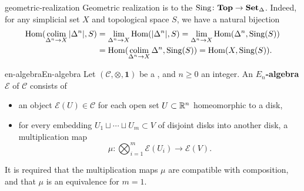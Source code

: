 \begin{example}{geometric-realization}
    Geometric realization is  to the  $\textup{Sing} \colon \textbf{Top} \to \textbf{Set}_\Delta$. Indeed, for any simplicial set $X$ and topological space $S$, we have a natural bijection
    \[ \begin{aligned}
        \operatorname{Hom}(\operatorname*{colim}_{\Delta^n \to X} |\Delta^n|, S) &= \lim_{\Delta^n \to X} \operatorname{Hom}(|\Delta^n|, S) = \lim_{\Delta^n \to X} \operatorname{Hom}(\Delta^n, \textup{Sing}(S)) \\ & = \operatorname{Hom}(\operatorname*{colim}_{\Delta^n \to X} \Delta^n, \textup{Sing}(S)) = \operatorname{Hom}(X, \textup{Sing}(S)) .
    \end{aligned} \]
\end{example}

\begin{topic}{en-algebra}{En-algebra}
    Let $(\mathcal{C}, \otimes, \textbf{1})$ be a  , and $n \ge 0$ an integer. An \textbf{$E_n$-algebra} $\mathcal{E}$ of $\mathcal{C}$ consists of
    \begin{itemize}
        \item an object $\mathcal{E}(U) \in \mathcal{C}$ for each open set $U \subset \mathbb{R}^n$ homeomorphic to a disk,
        \item for every embedding $U_1 \sqcup \cdots \sqcup U_m \subset V$ of disjoint disks into another disk, a multiplication map
        \[ \mu \colon \bigotimes_{i = 1}^{m} \mathcal{E}(U_i) \to \mathcal{E}(V) . \]
    \end{itemize}
    It is required that the multiplication maps $\mu$ are compatible with composition, and that $\mu$ is an equivalence for $m = 1$.
\end{topic}

